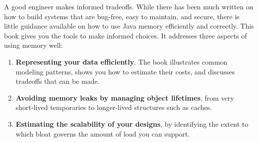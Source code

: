\begin{comment}
While the book is a collection of advice on practical topics, it is also
organized so as to give a systematic approach to memory issues. When read as a
whole it can be helpful in seeing the range of topics that need to be
considered, especially early in design. That does not mean that one must read
the whole book in order, or do a comprehensive analysis of every data structure
in your design, in order to get the benefit. The chapters are written to stand
on their own where possible, so that if a particular pattern comes up in your
code you can quickly get some ideas on costs and alternatives. At the same time,
familiarizing yourself with a few concepts in the Introduction will make the
reading much easier.
\end{comment}





\dividingline
  
A good engineer makes informed tradeoffs.  While there has been much written on
how to build systems that are bug-free, easy to maintain, and secure, there is
little guidance available on how to use Java memory efficiently and correctly.
This book gives you the tools to make informed choices. It
addresses three aspects of using memory well:
\begin{enumerate}
	\item \textbf{Representing your data efficiently}. The book illustrates
	common modeling patterns, shows you how to estimate their costs, and
	discusses tradeoffs that can be made.
	\item \textbf{Avoiding memory leaks by managing object lifetimes}, from very
	short-lived temporaries to longer-lived structures such as caches.
	\item \textbf{Estimating the scalability of your designs}, by identifying the
	extent to which bloat governs the amount of load you can support.
\end{enumerate}

